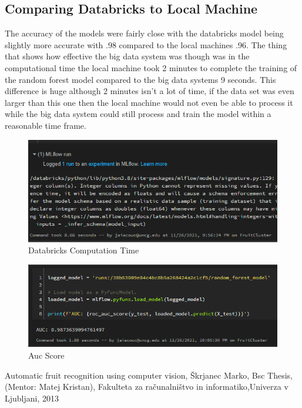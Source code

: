 \documentclass[conference]{IEEEtran}
\begin{document}
\subsection{Comparing Databricks to Local Machine}
The accuracy of the models were fairly close with the databricks model being slightly more accurate with .98 compared to the local machines .96. The thing that shows how effective the big data system was though was in the computational time the local machine took 2 minutes to complete the training of the random forest model compared to the big data systems 9 seconds. This difference is huge although 2 minutes isn't a lot of time, if the data set was even larger than this one then the local machine would not even be able to process it while the big data system could still process and train the model within a reasonable time frame.

\begin{figure}[h]
  \centering
  \includegraphics[width=\linewidth]{DB_RF_time.png}
  \caption{Databricks Computation Time}
\end{figure}

\begin{figure}[h]
  \centering
  \includegraphics[width=\linewidth]{auc_score.png}
  \caption{Auc Score}
\end{figure}

\begin{thebibliography}{00}
 Automatic fruit recognition using computer vision, Škrjanec Marko, Bsc Thesis, (Mentor: Matej Kristan), Fakulteta za računalništvo in informatiko,Univerza v Ljubljani, 2013

\end{thebibliography}
\end{document}
